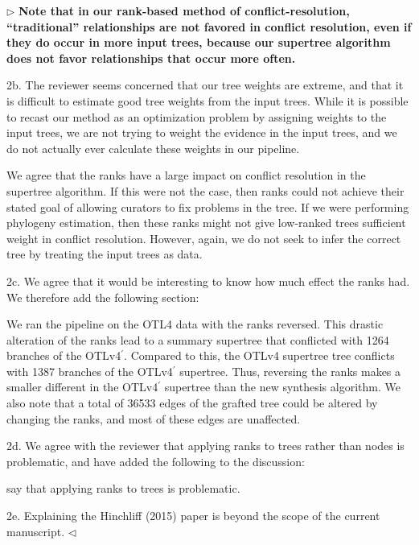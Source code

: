 \documentclass{article}
\newcommand{\otl}{OTLv4}
\newcommand{\otlprop}{OTLv4$^\prime$}
\newenvironment{reply}{$\triangleright$\bf}{$\triangleleft$}
\renewenvironment{quote}
               {\list{}{\rightmargin\leftmargin}%
                \item\relax\normalfont}
               {\endlist}
\begin{document}
\begin{reply}
Note that in our rank-based method of conflict-resolution, ``traditional'' relationships are not favored in conflict resolution, even if they do occur in more input trees, because our supertree algorithm does not favor relationships that occur more often.


2b. The reviewer seems concerned that our tree weights are extreme, and that it is difficult to estimate good tree weights from the input trees.  While it is possible to recast our method as an optimization problem by assigning weights to the input trees, we are not trying to weight the evidence in the input trees, and we do not actually ever calculate these weights in our pipeline.

We agree that the ranks have a large impact on conflict resolution in the supertree algorithm.   If this were not the case, then ranks could not achieve their stated goal of allowing curators to fix problems in the tree.  If we were performing phylogeny estimation, then these ranks might not give low-ranked trees sufficient weight in conflict resolution.  However, again, we do not seek to infer the correct tree by treating the input trees as data.


2c. We agree that it would be interesting to know how much effect the ranks had.  We therefore add the following section:
\begin{quote}
We ran the pipeline on the OTL4 data with the ranks reversed.  This drastic alteration of the ranks lead to a summary supertree that conflicted with 1264 branches of the \otlprop{}.  Compared to this, the \otl{} supertree tree conflicts with 1387 branches of the \otlprop{} supertree.  Thus, reversing the ranks makes a smaller different in the \otlprop{} supertree than the new synthesis algorithm.  We also note that a total of 36533 edges of the grafted tree could be altered by changing the ranks, and most of these edges are unaffected.
\end{quote}

2d. We agree with the reviewer that applying ranks to trees rather than nodes is problematic, and have added the following to the discussion:
\begin{quote}
 say that applying ranks to trees is problematic.
\end{quote}

2e. Explaining the Hinchliff (2015) paper is beyond the scope of the current manuscript.
\end{reply}
\end{document}
